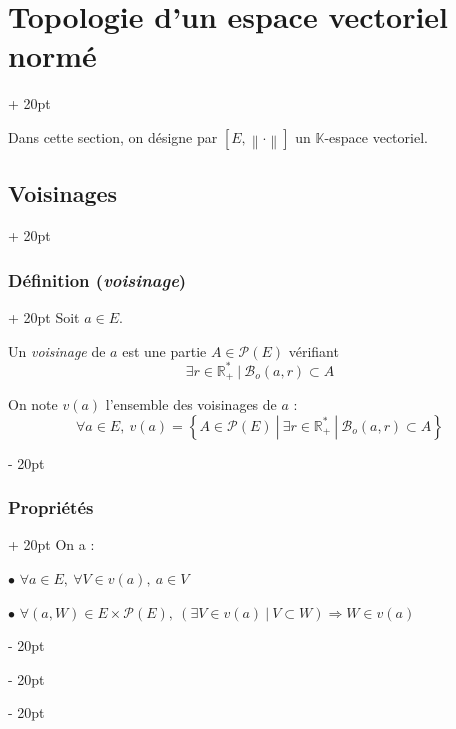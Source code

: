 \documentclass[a4paper, 12pt, twoside]{article}
\newcommand{\R}{\mathbb{R}} %
\newcommand{\K}{\mathbb K}
\newcommand{\lrb}[1]{\left[ #1 \right]}
\newcommand{\set}[1]{\left\{ #1 \right\}}
\newcommand{\norm}[1]{\left\lVert #1 \right\rVert}
\newcommand{\ind}[1][20pt]{\advance\leftskip + #1}
\newcommand{\deind}[1][20pt]{\advance\leftskip - #1}
\newenvironment{indt}[2][20pt]{#2 \par \ind[#1]}{\par \deind} %
\begin{document}
    \vspace{12pt}
    
    \begin{indt}{\section{Topologie d'un espace vectoriel normé}}

        Dans cette section, on désigne par $\lrb{E, \norm \cdot}$ un $\K$-espace vectoriel.

        \begin{indt}{\subsection{Voisinages}}
            \begin{indt}{\subsubsection{Définition (\textit{voisinage})}}
                Soit $a \in E$.

                Un \emph{voisinage} de $a$ est une partie $A \in \mathcal P(E)$ vérifiant
                \[
                    \exists r \in \R^*_+\ |\ \mathscr B_o(a, r) \subset A
                \]

                On note $v(a)$ l'ensemble des voisinages de $a$ :
                \[
                    \forall a \in E,\
                    v(a) = \set{A \in \mathcal P(E)\ |\ \exists r \in \R^*_+\ |\ \mathscr B_o(a, r) \subset A}
                \]
            \end{indt}

            \vspace{12pt}
            
            \begin{indt}{\subsubsection{Propriétés}}
                On a :

                $\bullet$ $
                    \forall a \in E,\
                    \forall V \in v(a),\ a \in V
                $

                $\bullet$ $
                    \forall (a, W) \in E \times \mathcal P(E),\
                    (\exists V \in v(a)\ |\ V \subset W) \Rightarrow W \in v(a)
                $

                \vspace{6pt}
                

\end{indt}
\end{indt}
\end{indt}
\end{document}
